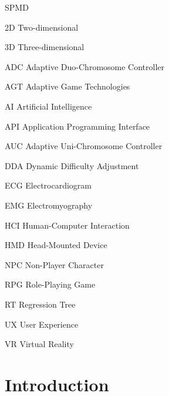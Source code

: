 \documentclass[cic,tc,english]{iiufrgs}
\begin{document}
\listoffigures

\listoftables


\begin{listofabbrv}{SPMD}
    \item[2D] Two-dimensional
    \item[3D] Three-dimensional
    \item[ADC] Adaptive Duo-Chromosome Controller
	\item[AGT] Adaptive Game Technologies
	\item[AI] Artificial Intelligence
	\item[API] Application Programming Interface
	\item[AUC] Adaptive Uni-Chromosome Controller 
    \item[DDA] Dynamic Difficulty Adjustment
    \item[ECG] Electrocardiogram
    \item[EMG] Electromyography
    \item[HCI] Human-Computer Interaction
    \item[HMD] Head-Mounted Device
    \item[NPC] Non-Player Character
    \item[RPG] Role-Playing Game
    \item[RT] Regression Tree
    \item[UX] User Experience
    \item[VR] Virtual Reality
\end{listofabbrv}


\tableofcontents


\chapter{Introduction}
\end{document}
